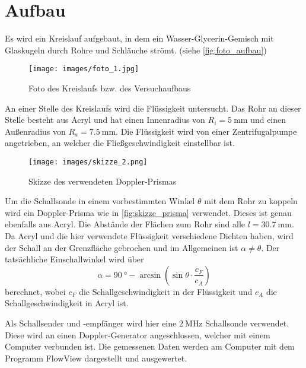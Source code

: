 \section{Aufbau}
\label{sec:Aufbau}

Es wird ein Kreislauf aufgebaut, in dem ein Wasser-Glycerin-Gemisch mit Glaskugeln durch Rohre und Schläuche strömt. (siehe \autoref{fig:foto_aufbau})

\begin{figure}
    \centering
    \texttt{[image: images/foto\_1.jpg]}
    \caption{Foto des Kreislaufs bzw. des Versuchaufbaus}
    \label{fig:foto_aufbau}
\end{figure}

An einer Stelle des Kreislaufs wird die Flüssigkeit untersucht.
Das Rohr an dieser Stelle besteht aus Acryl und hat einen Innenradius von $R_i=\SI{5}{\milli\metre}$ und einen Außenradius von $R_a=\SI{7.5}{\milli\metre}$.
Die Flüssigkeit wird von einer Zentrifugalpumpe angetrieben, an welcher die Fließgeschwindigkeit einstellbar ist.

\begin{figure}
    \centering
    \texttt{[image: images/skizze\_2.png]}
    \caption{Skizze des verwendeten Doppler-Prismas \cite{US3}}
    \label{fig:skizze_prisma}
\end{figure}

Um die Schallsonde in einem vorbestimmten Winkel $\theta$ mit dem Rohr zu koppeln wird ein Doppler-Prisma wie in \autoref{fig:skizze_prisma} verwendet.
Dieses ist genau ebenfalls aus Acryl.
Die Abstände der Flächen zum Rohr sind alle $l=\SI{30.7}{\milli\metre}$.
Da Acryl und die hier verwendete Flüssigkeit verschiedene Dichten haben, wird der Schall an der Grenzfläche gebrochen und im Allgemeinen ist $\alpha \neq \theta$.
Der tatsächliche Einschallwinkel wird über
\begin{equation}
    \alpha = \SI{90}{\degree} - \arcsin \left( \sin \theta \cdot \frac{c_F}{c_A} \right)
    \label{eq:dopplerwinkel}
\end{equation}
berechnet, wobei $c_F$ die Schallgeschwindigkeit in der Flüssigkeit und $c_A$ die Schallgeschwindigkeit in Acryl ist.


Als Schallsender und -empfänger wird hier eine $\SI{2}{\mega\hertz}$ Schallsonde verwendet.
Diese wird an einen Doppler-Generator angeschlossen, welcher mit einem Computer verbunden ist.
Die gemessenen Daten werden am Computer mit dem Programm FlowView dargestellt und ausgewertet.

